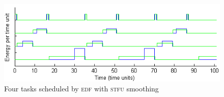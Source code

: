 \begin{figure}[htb]
\includegraphics[scale=0.64]{stfutasks.png}
\caption{Four tasks scheduled by \textsc{edf} with \textsc{stfu} smoothing}
\label{fig:stfutaskplot}
\end{figure}



































